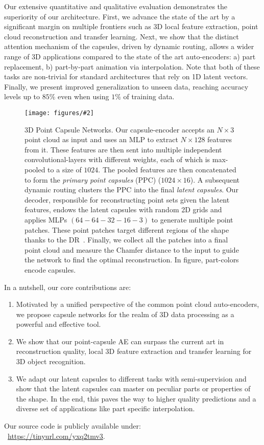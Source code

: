\documentclass[10pt,twocolumn,letterpaper]{article}
\theoremstyle{break}
\newcommand{\insertimageStar}[5]{ \begin{figure*}[#5]
\centering
\texttt{[image: figures/\#2]}
\caption{#3}
\label{#4}
\end{figure*}
}
\begin{document}
Our extensive quantitative and qualitative evaluation demonstrates the superiority of our architecture. First, we advance the state of the art by a significant margin on multiple frontiers such as 3D local feature extraction, point cloud reconstruction and transfer learning. Next, we show that the distinct attention mechanism of the capsules, driven by dynamic routing, allows a wider range of 3D applications compared to the state of the art auto-encoders: a) part replacement, b) part-by-part animation via interpolation. Note that both of these tasks are non-trivial for standard architectures that rely on 1D latent vectors. Finally, we present improved generalization to unseen data, reaching accuracy levels up to $85\%$ even when using $1\%$ of training data. 
\insertimageStar{0.9725}{pipeline_final_cropped.pdf}{3D Point Capsule Networks. Our capsule-encoder accepts an $N\times 3$ point cloud as input and uses an MLP to extract $N\times 128$ features from it. These features are then sent into multiple independent convolutional-layers with different weights, each of which is max-pooled to a size of $1024$. The pooled features are then concatenated to form the \textit{primary point capsules} (PPC) ($1024\times 16$). A subsequent dynamic routing clusters the PPC into the final \textit{latent capsules}. Our decoder, responsible for reconstructing point sets given the latent features, endows the latent capsules with random 2D grids and applies MLPs $(64-64-32-16-3)$ to generate multiple point patches. These point patches target different regions of the shape thanks to the DR~\cite{sabour2017dynamic}. Finally, we collect all the patches into a final point cloud and measure the Chamfer distance to the input to guide the network to find the optimal reconstruction. In figure, part-colors encode capsules.\vspace{-3.5mm}}{fig:3dpointcapsnet}{t!}
In a nutshell, our core contributions are: 
\begin{enumerate}[itemsep=0ex]
\item Motivated by a unified perspective of the common point cloud auto-encoders, we propose capsule networks for the realm of 3D data processing as a powerful and effective tool. \item We show that our point-capsule AE can surpass the current art in reconstruction quality, local 3D feature extraction and transfer learning for 3D object recognition.
\item We adapt our latent capsules to different tasks with semi-supervision and show that the latent capsules can master on peculiar parts or properties of the shape. In the end, this paves the way to higher quality predictions and a diverse set of applications like part specific interpolation.
\end{enumerate}\vspace{0.3pt}
Our source code is publicly available under:\\~{\small{\url{https://tinyurl.com/yxq2tmv3}}}\normalfont.
\end{document}
